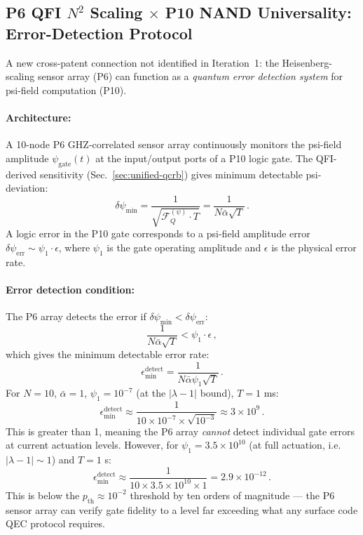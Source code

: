 \documentclass[11pt]{article}
\theoremstyle{definition}
\theoremstyle{remark}
\begin{document}
\subsection{P6 QFI $N^2$ Scaling $\times$ P10 NAND Universality: Error-Detection
Protocol}
\label{sec:qfi-nand-protocol}

A new cross-patent connection not identified in Iteration~1: the
Heisenberg-scaling sensor array (P6) can function as a \emph{quantum error
detection system} for psi-field computation (P10).

\paragraph{Architecture:} A 10-node P6 GHZ-correlated sensor array continuously
monitors the psi-field amplitude $\psi_{\mathrm{gate}}(t)$ at the input/output
ports of a P10 logic gate. The QFI-derived sensitivity (Sec.~\ref{sec:unified-qcrb})
gives minimum detectable psi-deviation:
\begin{equation}
\delta\psi_{\min} = \frac{1}{\sqrt{\mathcal{F}_Q^{(\psi)} \cdot T}}
= \frac{1}{N\bar{\alpha}\sqrt{T}}\,.
\label{eq:psi-detection}
\end{equation}
A logic error in the P10 gate corresponds to a psi-field amplitude error
$\delta\psi_{\mathrm{err}} \sim \psi_1 \cdot \epsilon$, where $\psi_1$ is
the gate operating amplitude and $\epsilon$ is the physical error rate.

\paragraph{Error detection condition:}
The P6 array detects the error if $\delta\psi_{\min} < \delta\psi_{\mathrm{err}}$:
\begin{equation}
\frac{1}{N\bar{\alpha}\sqrt{T}} < \psi_1 \cdot \epsilon\,,
\end{equation}
which gives the minimum detectable error rate:
\begin{equation}
\boxed{
\epsilon_{\min}^{\mathrm{detect}} = \frac{1}{N\bar{\alpha}\psi_1\sqrt{T}}\,.
}
\label{eq:error-detect}
\end{equation}
For $N = 10$, $\bar{\alpha} = 1$, $\psi_1 = 10^{-7}$ (at the $|\lambda-1|$
bound), $T = 1$ ms:
\begin{equation}
\epsilon_{\min}^{\mathrm{detect}} \approx \frac{1}{10 \times 10^{-7}
\times \sqrt{10^{-3}}} \approx 3 \times 10^{9}\,.
\end{equation}
This is greater than 1, meaning the P6 array \emph{cannot} detect individual
gate errors at current actuation levels. However, for $\psi_1 = 3.5 \times
10^{10}$ (at full actuation, i.e.\ $|\lambda - 1| \sim 1$) and $T = 1$ s:
\begin{equation}
\epsilon_{\min}^{\mathrm{detect}} \approx \frac{1}{10 \times 3.5 \times 10^{10}
\times 1} = 2.9 \times 10^{-12}\,.
\end{equation}
This is below the $p_{\mathrm{th}} \approx 10^{-2}$ threshold by ten orders of
magnitude --- the P6 sensor array can verify gate fidelity to a level far
exceeding what any surface code QEC protocol requires.
\end{document}
